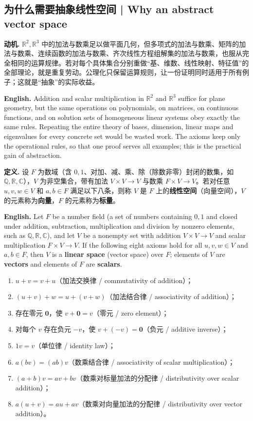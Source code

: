\documentclass[UTF8,11pt,a4paper]{ctexart}
\newcommand{\EN}[1]{\par\noindent\textbf{English.} #1\par}
\begin{document}
\subsection{为什么需要抽象线性空间 | Why an abstract vector space}
\noindent\textbf{动机.} $\mathbb R^2,\mathbb R^3$ 中的加法与数乘足以做平面几何，但多项式的加法与数乘、矩阵的加法与数乘、连续函数的加法与数乘、齐次线性方程组解集的加法与数乘，也服从完全相同的运算规律。若对每个具体集合分别重做“基、维数、线性映射、特征值”的全部理论，就是重复劳动。公理化只保留运算规则，让一份证明同时适用于所有例子；这就是“抽象”的实际收益。
\EN{Addition and scalar multiplication in $\mathbb R^2$ and $\mathbb R^3$ suffice for plane geometry, but the same operations on polynomials, on matrices, on continuous functions, and on solution sets of homogeneous linear systems obey exactly the same rules. Repeating the entire theory of bases, dimension, linear maps and eigenvalues for every concrete set would be wasted work. The axioms keep only the operational rules, so that one proof serves all examples; this is the practical gain of abstraction.}
\noindent\textbf{定义.} 设 $F$ 为数域（含 $0,1$、对加、减、乘、除（除数非零）封闭的数集，如 $\mathbb Q,\mathbb R,\mathbb C$），$V$ 为非空集合，带有加法 $V\times V\to V$ 与数乘 $F\times V\to V$。若对任意 $u,v,w\in V$ 和 $a,b\in F$ 满足以下八条，则称 $V$ 是 $F$ 上的\textbf{线性空间}（向量空间），$V$ 的元素称为\textbf{向量}，$F$ 的元素称为\textbf{标量}。
\EN{Let $F$ be a number field (a set of numbers containing $0,1$ and closed under addition, subtraction, multiplication and division by nonzero elements, such as $\mathbb Q,\mathbb R,\mathbb C$), and let $V$ be a nonempty set with addition $V\times V\to V$ and scalar multiplication $F\times V\to V$. If the following eight axioms hold for all $u,v,w\in V$ and $a,b\in F$, then $V$ is a \textbf{linear space} (vector space) over $F$; elements of $V$ are \textbf{vectors} and elements of $F$ are \textbf{scalars}.}
\begin{enumerate}[label=(V\arabic*),leftmargin=3.4em,itemsep=1pt,topsep=2pt]
\item $u+v=v+u$（加法交换律 / commutativity of addition）；
\item $(u+v)+w=u+(v+w)$（加法结合律 / associativity of addition）；
\item 存在零元 $\mathbf 0$，使 $v+\mathbf 0=v$（零元 / zero element）；
\item 对每个 $v$ 存在负元 $-v$，使 $v+(-v)=\mathbf 0$（负元 / additive inverse）；
\item $1v=v$（单位律 / identity law）；
\item $a(bv)=(ab)v$（数乘结合律 / associativity of scalar multiplication）；
\item $(a+b)v=av+bv$（数乘对标量加法的分配律 / distributivity over scalar addition）；
\item $a(u+v)=au+av$（数乘对向量加法的分配律 / distributivity over vector addition）。
\end{enumerate}
\end{document}
